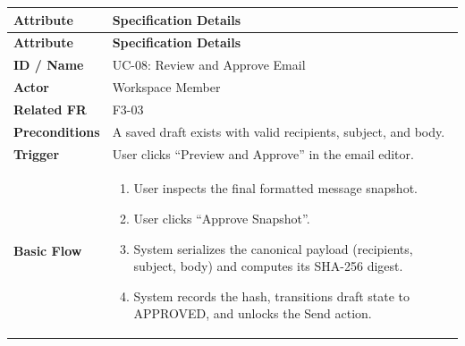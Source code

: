\begin{longtable}{>{\raggedright\arraybackslash}p{}>{\raggedright\arraybackslash}p{}}

\hline

\rowcolor{tablehead}

\textbf{Attribute} & \textbf{Specification Details} \\ \hline

\endfirsthead

\hline

\rowcolor{tablehead}

\textbf{Attribute} & \textbf{Specification Details} \\ \hline

\endhead

\endfoot

\endlastfoot

\textbf{ID / Name} & UC-08: Review and Approve Email \\ \hline

\textbf{Actor} & Workspace Member \\ \hline

\textbf{Related FR} & F3-03 \\ \hline

\textbf{Preconditions} & A saved draft exists with valid recipients, subject, and body. \\ \hline

\textbf{Trigger} & User clicks ``Preview and Approve'' in the email editor. \\ \hline

\textbf{Basic Flow} & \begin{enumerate}[nosep,leftmargin=*,label=\arabic*.]

    \item User inspects the final formatted message snapshot.

    \item User clicks ``Approve Snapshot''.

    \item System serializes the canonical payload (recipients, subject, body) and computes its SHA-256 digest.

    \item System records the hash, transitions draft state to APPROVED, and unlocks the Send action.

\end{enumerate} \\ \hline


\end{longtable}
